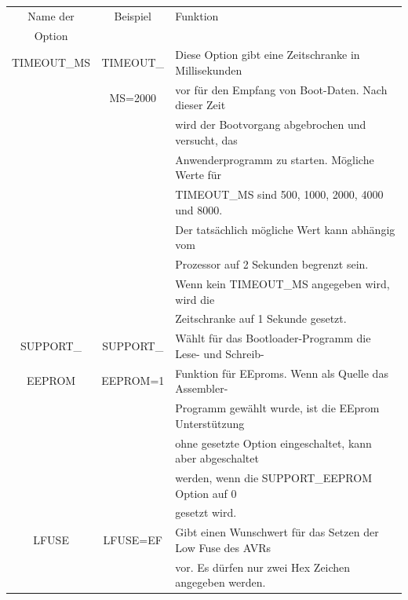 \begin{table}[H]
  \begin{center}
    \begin{tabular}{| c | c | l |}
    \hline
   Name der        & Beispiel       & Funktion                                            \\
    Option         &                &                                                     \\
    \hline
    \hline
 TIMEOUT\_MS       & TIMEOUT\_      & Diese Option gibt eine Zeitschranke in Millisekunden \\
                   &  MS=2000       & vor für den Empfang von Boot-Daten. Nach dieser Zeit\\
                   &                & wird der Bootvorgang abgebrochen und versucht, das \\
                   &                & Anwenderprogramm zu starten. Mögliche Werte für \\
                   &                & TIMEOUT\_MS sind 500, 1000, 2000, 4000 und 8000. \\
                   &                & Der tatsächlich mögliche Wert kann abhängig vom \\
                   &                & Prozessor auf 2 Sekunden begrenzt sein. \\
                   &                & Wenn kein TIMEOUT\_MS angegeben wird, wird die \\
                   &                & Zeitschranke auf 1 Sekunde gesetzt. \\
    \hline
    SUPPORT\_      & SUPPORT\_      & Wählt für das Bootloader-Programm die Lese- und Schreib- \\
    EEPROM         &  EEPROM=1      & Funktion für EEproms. Wenn als Quelle das Assembler- \\
                   &                & Programm gewählt wurde, ist die EEprom Unterstützung \\
                   &                & ohne gesetzte Option eingeschaltet, kann aber abgeschaltet\\
                   &                & werden, wenn die SUPPORT\_EEPROM Option auf 0 \\
                   &                & gesetzt wird. \\
    \hline
    LFUSE          & LFUSE=EF       & Gibt einen Wunschwert für das Setzen der Low Fuse des AVRs \\
                   &                & vor. Es dürfen nur zwei Hex Zeichen angegeben werden. \\

\end{tabular}
\end{center}
\end{table}
